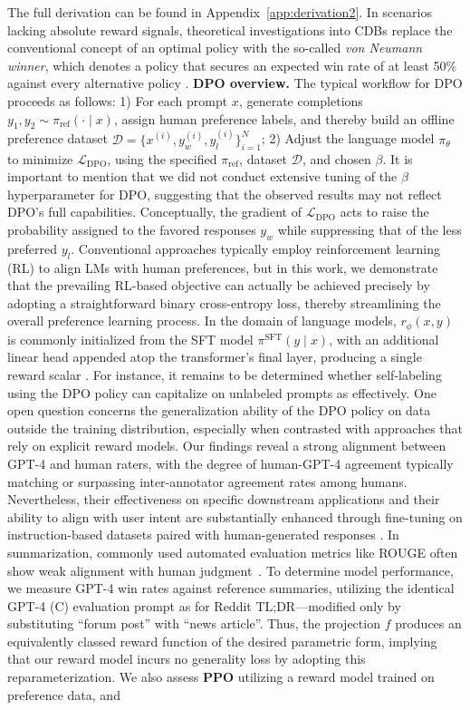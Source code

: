 The full derivation can be found in Appendix~\ref{app:derivation2}. In scenarios lacking absolute reward signals, theoretical investigations into CDBs replace the conventional concept of an optimal policy with the so-called \textit{von Neumann winner}, which denotes a policy that secures an expected win rate of at least 50\% against every alternative policy \citep{dudik2015contextual}. \textbf{DPO overview.} The typical workflow for DPO proceeds as follows: 1) For each prompt $x$, generate completions $y_1, y_2 \sim \pi_\text{ref}(\cdot \mid x)$, assign human preference labels, and thereby build an offline preference dataset $\mathcal{D} = \{x^{(i)}, y_w^{(i)}, y_l^{(i)}\}_{i=1}^N$; 2) Adjust the language model $\pi_\theta$ to minimize $\mathcal{L}_\text{DPO}$, using the specified $\pi_\text{ref}$, dataset $\mathcal{D}$, and chosen $\beta$. It is important to mention that we did not conduct extensive tuning of the $\beta$ hyperparameter for DPO, suggesting that the observed results may not reflect DPO's full capabilities. Conceptually, the gradient of $\mathcal{L}_\text{DPO}$ acts to raise the probability assigned to the favored responses $y_w$ while suppressing that of the less preferred $y_l$. Conventional approaches typically employ reinforcement learning (RL) to align LMs with human preferences, but in this work, we demonstrate that the prevailing RL-based objective can actually be achieved precisely by adopting a straightforward binary cross-entropy loss, thereby streamlining the overall preference learning process. In the domain of language models, $r_{\phi}(x, y)$ is commonly initialized from the SFT model $\pi^\text{SFT}(y \mid x)$, with an additional linear head appended atop the transformer's final layer, producing a single reward scalar \cite{ziegler2020finetuning}. For instance, it remains to be determined whether self-labeling using the DPO policy can capitalize on unlabeled prompts as effectively. One open question concerns the generalization ability of the DPO policy on data outside the training distribution, especially when contrasted with approaches that rely on explicit reward models. Our findings reveal a strong alignment between GPT-4 and human raters, with the degree of human-GPT-4 agreement typically matching or surpassing inter-annotator agreement rates among humans. Nevertheless, their effectiveness on specific downstream applications and their ability to align with user intent are substantially enhanced through fine-tuning on instruction-based datasets paired with human-generated responses \citep{mishra-etal-2022-cross,sanh2022multitask,chung2022scaling,thoppilan2022lamda}. In summarization, commonly used automated evaluation metrics like ROUGE often show weak alignment with human judgment~\citep{stiennon2022learning}. To determine model performance, we measure GPT-4 win rates against reference summaries, utilizing the identical GPT-4 (C) evaluation prompt as for Reddit TL;DR—modified only by substituting ``forum post'' with ``news article''. Thus, the projection $f$ produces an equivalently classed reward function of the desired parametric form, implying that our reward model incurs no generality loss by adopting this reparameterization. We also assess \textbf{PPO} \citep{schulman2017proximal} utilizing a reward model trained on preference data, and 